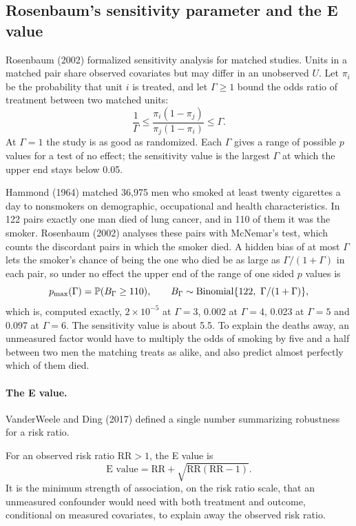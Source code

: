 \subsection{Rosenbaum's sensitivity parameter and the E value}

Rosenbaum (2002) formalized sensitivity analysis for matched studies. Units in a matched pair share observed covariates but may differ in an unobserved $U$. Let $\pi_i$ be the probability that unit $i$ is treated, and let $\Gamma \geq 1$ bound the odds ratio of treatment between two matched units:
\[
\frac{1}{\Gamma} \leq \frac{\pi_i(1 - \pi_j)}{\pi_j(1 - \pi_i)} \leq \Gamma.
\]
At $\Gamma = 1$ the study is as good as randomized. Each $\Gamma$ gives a range of possible $p$ values for a test of no effect; the sensitivity value is the largest $\Gamma$ at which the upper end stays below 0.05.

Hammond (1964) matched 36,975 men who smoked at least twenty cigarettes a day to nonsmokers on demographic, occupational and health characteristics. In 122 pairs exactly one man died of lung cancer, and in 110 of them it was the smoker. Rosenbaum (2002) analyses these pairs with McNemar's test, which counts the discordant pairs in which the smoker died. A hidden bias of at most $\Gamma$ lets the smoker's chance of being the one who died be as large as $\Gamma/(1 + \Gamma)$ in each pair, so under no effect the upper end of the range of one sided $p$ values is
\[
p_{\max}(\Gamma) = \mathbb{P}(B_\Gamma \geq 110), \qquad B_\Gamma \sim \mathrm{Binomial}\{122,\ \Gamma/(1 + \Gamma)\},
\]
which is, computed exactly, $2 \times 10^{-5}$ at $\Gamma = 3$, 0.002 at $\Gamma = 4$, 0.023 at $\Gamma = 5$ and 0.097 at $\Gamma = 6$. The sensitivity value is about 5.5. To explain the deaths away, an unmeasured factor would have to multiply the odds of smoking by five and a half between two men the matching treats as alike, and also predict almost perfectly which of them died.

\paragraph{The E value.} VanderWeele and Ding (2017) defined a single number summarizing robustness for a risk ratio.

\begin{definition}[E value]
For an observed risk ratio $\mathrm{RR} > 1$, the E value is
\[
\text{E value} = \mathrm{RR} + \sqrt{\mathrm{RR}(\mathrm{RR} - 1)}.
\]
It is the minimum strength of association, on the risk ratio scale, that an unmeasured confounder would need with both treatment and outcome, conditional on measured covariates, to explain away the observed risk ratio.
\end{definition}


